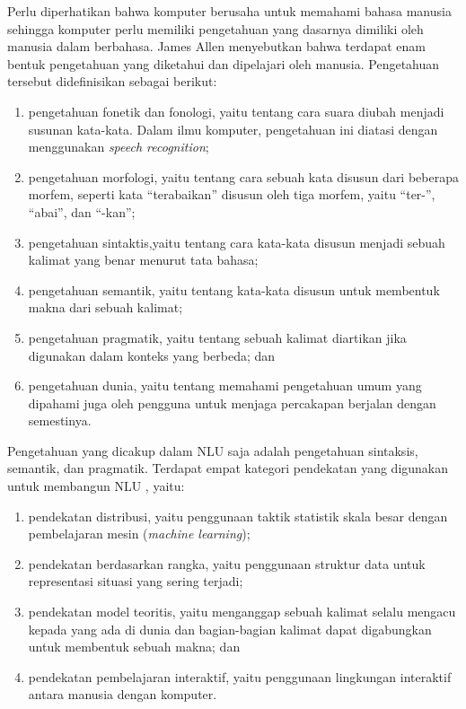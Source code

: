 Perlu diperhatikan bahwa komputer berusaha untuk memahami bahasa manusia sehingga komputer perlu memiliki pengetahuan yang dasarnya dimiliki oleh manusia dalam berbahasa. James Allen \parencite{allen1995natural} menyebutkan bahwa terdapat enam bentuk pengetahuan yang diketahui dan dipelajari oleh manusia. Pengetahuan tersebut didefinisikan sebagai berikut:
\begin{enumerate}
	\item pengetahuan fonetik dan fonologi, yaitu tentang cara suara diubah menjadi susunan kata-kata. Dalam ilmu komputer, pengetahuan ini diatasi dengan menggunakan \textit{speech recognition};
	\item pengetahuan morfologi, yaitu tentang cara sebuah kata disusun dari beberapa morfem, seperti kata “terabaikan” disusun oleh tiga morfem, yaitu “ter-”, “abai”, dan “-kan”;
	\item pengetahuan sintaktis,yaitu tentang cara kata-kata disusun menjadi sebuah kalimat yang benar menurut tata bahasa;
	\item pengetahuan semantik, yaitu tentang kata-kata disusun untuk membentuk makna dari sebuah kalimat;
	\item pengetahuan pragmatik, yaitu tentang sebuah kalimat diartikan jika digunakan dalam konteks yang berbeda; dan
	\item pengetahuan dunia, yaitu tentang memahami pengetahuan umum yang dipahami juga oleh pengguna untuk menjaga percakapan berjalan dengan semestinya.
\end{enumerate}

Pengetahuan yang dicakup dalam NLU saja adalah pengetahuan sintaksis, semantik, dan pragmatik. Terdapat empat kategori pendekatan yang digunakan untuk membangun NLU \parencite{yao2017four}, yaitu:
\begin{enumerate}
	\item pendekatan distribusi, yaitu penggunaan taktik statistik skala besar dengan pembelajaran mesin (\textit{machine learning});
	\item pendekatan berdasarkan rangka, yaitu penggunaan struktur data untuk representasi situasi yang sering terjadi;
	\item pendekatan model teoritis, yaitu menganggap sebuah kalimat selalu mengacu kepada yang ada di dunia dan bagian-bagian kalimat dapat digabungkan untuk membentuk sebuah makna; dan
	\item pendekatan pembelajaran interaktif, yaitu penggunaan  lingkungan interaktif antara manusia dengan komputer.
\end{enumerate}


